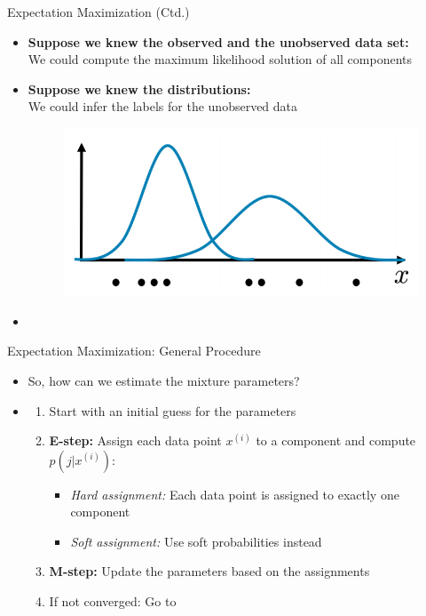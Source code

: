 \begin{frame}{Expectation Maximization (Ctd.)}{}
	\begin{itemize}
		\item \textbf{Suppose we knew the observed and the unobserved data set:} \\
			We could compute the maximum likelihood solution of all components
		\item \textbf{Suppose we knew the distributions:} \\
			We could infer the labels for the unobserved data
		\begin{figure}
			\centering
			\includegraphics[scale=0.3]{04_density_estimation/02_img/em_2}
		\end{figure}
		\item {}
	\end{itemize}
\end{frame}


\begin{frame}{Expectation Maximization: General Procedure}{}
	\begin{itemize}
		\item So, how can we estimate the mixture parameters?
		\item {}
		\begin{enumerate}
			\item Start with an initial guess for the parameters
			\item \textbf{E-step:} Assign each data point $x^{(i)}$ to a component and compute $p(j \vert x^{(i)})$:
			\begin{itemize}
				\item \textit{Hard assignment:} Each data point is assigned to exactly one component  
				\item \textit{Soft assignment:} Use soft probabilities instead
			\end{itemize}
			\item \textbf{M-step:} Update the parameters based on the assignments
			\item If not converged: Go to 
		\end{enumerate}
	\end{itemize}
\end{frame}


